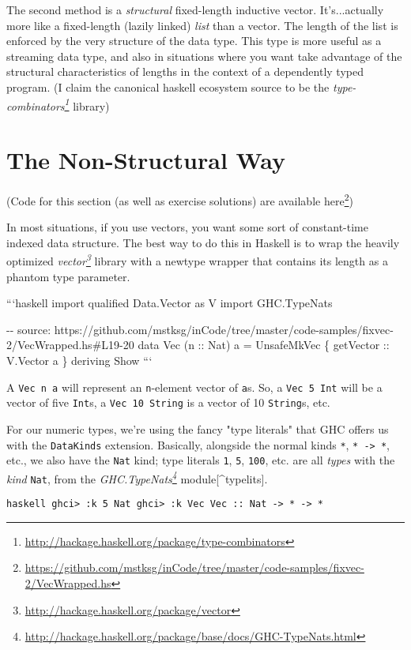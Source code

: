 \documentclass[]{article}
\renewcommand{\href}[2]{#2\footnote{\url{#1}}}
\begin{document}
The second method is a \emph{structural} fixed-length inductive vector.
It's...actually more like a fixed-length (lazily linked) \emph{list} than a
vector. The length of the list is enforced by the very structure of the data
type. This type is more useful as a streaming data type, and also in situations
where you want take advantage of the structural characteristics of lengths in
the context of a dependently typed program. (I claim the canonical haskell
ecosystem source to be the
\emph{\href{http://hackage.haskell.org/package/type-combinators}{type-combinators}}
library)

\section{The Non-Structural Way}

(Code for this section (as well as exercise solutions) are
\href{https://github.com/mstksg/inCode/tree/master/code-samples/fixvec-2/VecWrapped.hs}{available
here})

In most situations, if you use vectors, you want some sort of constant-time
indexed data structure. The best way to do this in Haskell is to wrap the
heavily optimized
\emph{\href{http://hackage.haskell.org/package/vector}{vector}} library with a
newtype wrapper that contains its length as a phantom type parameter.

```haskell import qualified Data.Vector as V import GHC.TypeNats

-\/- source:
https://github.com/mstksg/inCode/tree/master/code-samples/fixvec-2/VecWrapped.hs\#L19-20
data Vec (n :: Nat) a = UnsafeMkVec \{ getVector :: V.Vector a \} deriving Show
```

A \texttt{Vec\ n\ a} will represent an \texttt{n}-element vector of \texttt{a}s.
So, a \texttt{Vec\ 5\ Int} will be a vector of five \texttt{Int}s, a
\texttt{Vec\ 10\ String} is a vector of 10 \texttt{String}s, etc.

For our numeric types, we're using the fancy "type literals" that GHC offers us
with the \texttt{DataKinds} extension. Basically, alongside the normal kinds
\texttt{*}, \texttt{*\ -\textgreater{}\ *}, etc., we also have the \texttt{Nat}
kind; type literals \texttt{1}, \texttt{5}, \texttt{100}, etc. are all
\emph{types} with the \emph{kind} \texttt{Nat}, from the
\emph{\href{http://hackage.haskell.org/package/base/docs/GHC-TypeNats.html}{GHC.TypeNats}}
module{[}\^{}typelits{]}.

\texttt{haskell\ ghci\textgreater{}\ :k\ 5\ Nat\ ghci\textgreater{}\ :k\ Vec\ Vec\ ::\ Nat\ -\textgreater{}\ *\ -\textgreater{}\ *}
\end{document}
